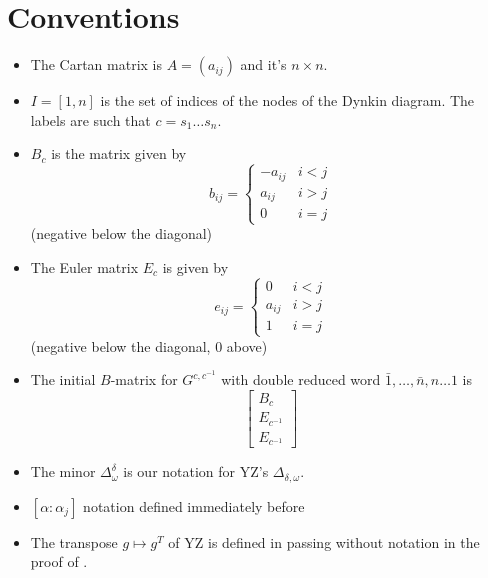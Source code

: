 \documentclass[11pt]{amsart}
\numberwithin{equation}{section}
\begin{document}
\section{Conventions}

\begin{itemize}

  \item 
    The Cartan matrix is $A=(a_{ij})$ and it's $n \times n$.

  \item 
    $I=[1,n]$ is the set of indices of the nodes of the Dynkin diagram. The labels are such that $c=s_1\dots s_n$.

  \item 
    $B_c$ is the matrix given by
    \[
      b_{ij} = \begin{cases}
        -a_{ij} & i<j\\
        a_{ij}  & i>j\\
        0       & i=j
      \end{cases}
    \]
    (negative below the diagonal)

  \item
    The Euler matrix $E_c$ is given by
    \[
      e_{ij} = \begin{cases}
        0       & i<j\\
        a_{ij}  & i>j\\
        1       & i=j
      \end{cases}
    \]
    (negative below the diagonal, 0 above)

  \item
    The initial $B$-matrix for $G^{c,c^{-1}}$ with double reduced word $\bar 1,\dots,\bar n,n\dots 1$ is
    \[
      \left[
        \begin{array}{c}
          B_c\\
          E_{c^{-1}}\\
          E_{c^{-1}}
        \end{array}
      \right]
    \]
  
  \item 
    The minor $\Delta_\omega^\delta$ is our notation for YZ's $\Delta_{\delta, \omega}$.
  
  \item 
    $[\alpha:\alpha_j]$ notation defined immediately before 
  
  \item 
    The transpose $g \mapsto g^T$ of YZ is defined in passing without notation in the proof of .
  

\end{itemize}
\end{document}
